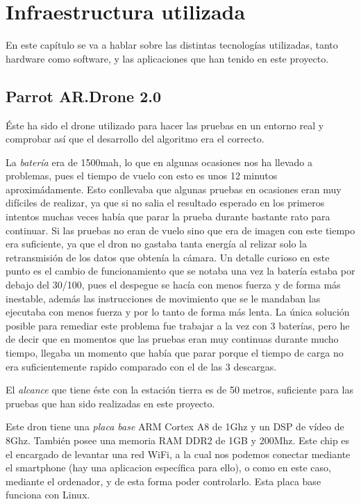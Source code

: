 \chapter{Infraestructura utilizada}\label{cap.infraestructura}
En este cap\'itulo se va a hablar sobre las distintas tecnolog\'ias utilizadas, tanto hardware como software, y las aplicaciones que han tenido en este proyecto. 

\section{Parrot AR.Drone 2.0 }
\hspace{1 cm} \'Este ha sido el drone utilizado para hacer las pruebas en un entorno real y comprobar as\'i que el desarrollo del algoritmo era el correcto. 

\hspace{1 cm} La \textsl{bater\'ia} era de 1500mah, lo que en algunas ocasiones nos ha llevado a problemas, pues el tiempo de vuelo con esto es unos 12 minutos aproxim\'adamente. Esto conllevaba que algunas pruebas en ocasiones eran muy dif\'iciles de realizar, ya que si no salia el resultado esperado en los primeros intentos muchas veces hab\'ia que parar la prueba durante bastante rato para continuar. Si las pruebas no eran de vuelo sino que era de imagen con este tiempo era suficiente, ya que el dron no gastaba tanta energ\'ia al relizar solo la retransmisi\'on de los datos que obten\'ia la c\'amara. Un detalle curioso en este punto es el cambio de funcionamiento que se notaba una vez la bater\'ia estaba por debajo del 30/100, pues el despegue se hac\'ia con menos fuerza y de forma m\'as inestable, adem\'as las instrucciones de movimiento que se le mandaban las ejecutaba con menos fuerza y por lo tanto de forma m\'as lenta. La \'unica soluci\'on posible para remediar este problema fue trabajar a la vez con 3 bater\'ias, pero he de decir que en momentos que las pruebas eran muy continuas durante mucho tiempo, llegaba un momento que hab\'ia que parar porque el tiempo de carga no era suficientemente rapido comparado con el de las 3 descargas. 

\hspace{1 cm} El \textsl{alcance} que tiene \'este con la estaci\'on tierra es de 50 metros, suficiente para las pruebas que han sido realizadas en este proyecto. 

\hspace{1 cm} Este dron tiene una \textsl{placa base} ARM Cortex A8 de 1Ghz y un DSP de v\'ideo de 8Ghz. Tambi\'en posee una memoria RAM DDR2 de 1GB y 200Mhz. Este chip es el encargado de levantar una red WiFi, a la cual nos podemos conectar mediante el smartphone (hay una aplicacion espec\'ifica para ello), o como en este caso, mediante el ordenador, y de esta forma poder controlarlo. Esta placa base funciona con Linux. 

